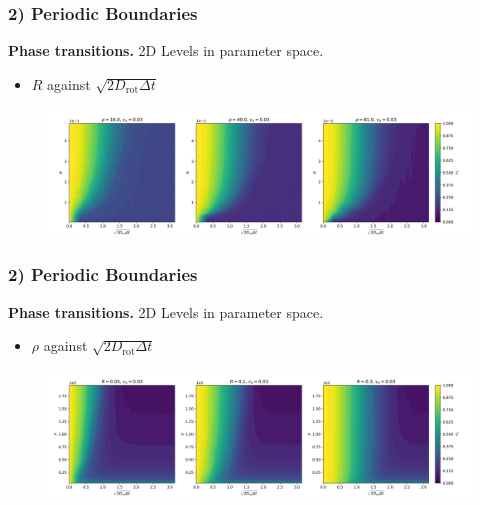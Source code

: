\begin{frame}
	\frametitle{2) Periodic Boundaries}
	\textbf{Phase transitions.} 2D Levels in parameter space.
	\begin{itemize}
	    \item $R$ against $\sqrt{2D_{\text{rot}}\Delta t}$
	\end{itemize}
	\begin{figure}[H]
  		\includegraphics[width=\textwidth]{images/chapter2/r_eta_transition_2D_plots_rho_comparison.png} 
	\end{figure}
\end{frame}

\begin{frame}
	\frametitle{2) Periodic Boundaries}
	\textbf{Phase transitions.} 2D Levels in parameter space.
	\begin{itemize}
	    \item $\rho$ against $\sqrt{2D_{\text{rot}}\Delta t}$
	\end{itemize}
	\begin{figure}[H]
  		\includegraphics[width=\textwidth]{images/chapter2/rho_eta_transition_2D_plots_r_comparison.png} 
	\end{figure}
\end{frame}

